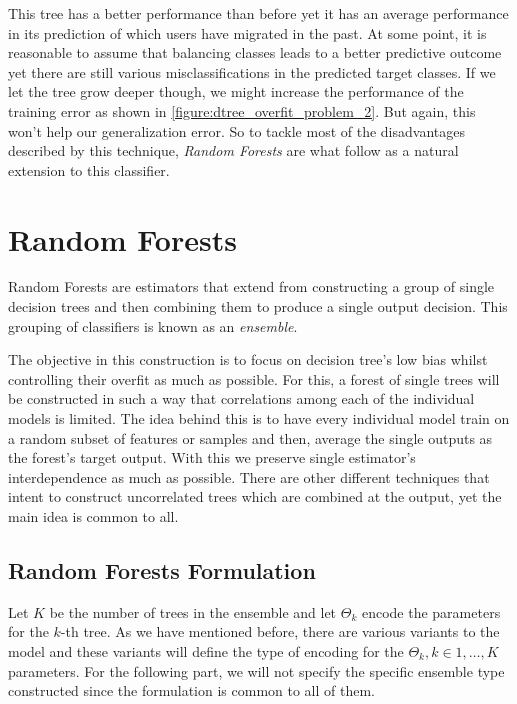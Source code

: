 This tree has a better performance than before yet it has an average performance in its prediction of which users have migrated in the past.
At some point, it is reasonable to assume that balancing classes leads to a better predictive outcome yet there are still various misclassifications in the predicted target classes.
If we let the tree grow deeper though, we might increase the performance of the training error as shown in \cref{figure:dtree_overfit_problem_2}.
But again, this won't help our generalization error.
So to tackle most of the disadvantages described by this technique, \textit{Random Forests} are what follow as a natural extension to this classifier.

\section{ Random Forests}\label{section:random_forests}

Random Forests are estimators that extend from constructing a group of single decision trees and then combining them to produce a single output decision.
This grouping of classifiers is known as an \textit{ensemble}.

The objective in this construction is to focus on decision tree's low bias whilst controlling their overfit as much as possible.
For this, a forest of single trees will be constructed in such a way that correlations among each of the individual models is limited.
The idea behind this is to have every individual model train on a random subset of features or samples and then, average the single outputs as the forest's target output.
With this we preserve single estimator's interdependence as much as possible.
There are other different techniques that intent to construct uncorrelated trees which are combined at the output, yet the main idea is common to all.

\subsection{ Random Forests Formulation}\label{subsection:random_forests_formulation}

Let $K$ be the number of trees in the ensemble and let $\Theta_k$ encode the parameters for the $k$-th tree.
As we have mentioned before, there are various variants to the model and these variants will define the type of encoding for the $\Theta_k, k \in {1,\ldots,K}$  parameters.
For the following part, we will not specify the specific ensemble type constructed since the formulation is common to all of them.

